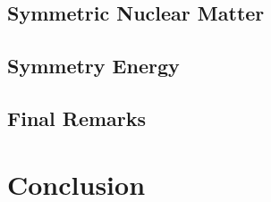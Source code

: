 \documentclass[12pt]{book}
\begin{document}
    \section{Symmetric Nuclear Matter}
        
        

    \section{Symmetry Energy}
        

    \section{Final Remarks}
        
    


\chapter{Conclusion}
    

%
\printbibliography
\end{document}
